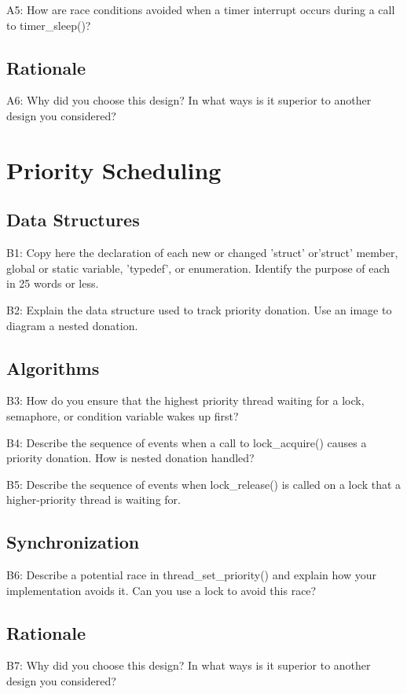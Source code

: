 \documentclass[journal]{IEEEtran}
\begin{document}
A5: How are race conditions avoided when a timer interrupt occurs during a call to timer\_sleep()?
\subsection{Rationale}
A6: Why did you choose this design?  In what ways is it superior to another design you considered?
\section{Priority Scheduling}

\subsection{Data Structures}
B1: Copy here the declaration of each new or changed 'struct' or'struct' member, global or static variable, 'typedef', or enumeration.  Identify the purpose of each in 25 words or less.

B2: Explain the data structure used to track priority donation. Use an image to diagram a nested donation.
\subsection{Algorithms}
B3: How do you ensure that the highest priority thread waiting for a lock, semaphore, or condition variable wakes up first?

B4: Describe the sequence of events when a call to lock\_acquire() causes a priority donation.  How is nested donation handled?

B5: Describe the sequence of events when lock\_release() is called on a lock that a higher-priority thread is waiting for.
\subsection{Synchronization}
B6: Describe a potential race in thread\_set\_priority() and explain  how your implementation avoids it.  Can you use a lock to avoid this race?
\subsection{Rationale}
B7: Why did you choose this design?  In what ways is it superior to another design you considered?
\end{document}
